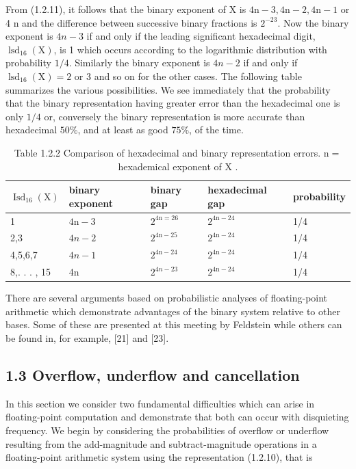 \documentclass[10pt]{article}
\begin{document}
From (1.2.11), it follows that the binary exponent of X is $4 \mathrm{n}-3,4 \mathrm{n}-2,4 \mathrm{n}-1$ or 4 n and the difference between successive binary fractions is $2^{-23}$. Now the binary exponent is $4 n-3$ if and only if the leading significant hexadecimal digit, $\operatorname{lsd}_{16}(\mathrm{X})$, is 1 which occurs according to the logarithmic distribution with probability $1 / 4$. Similarly the binary exponent is $4 n-2$ if and only if $\operatorname{lsd}_{16}(\mathrm{X})=2$ or 3 and so on for the other cases. The following table summarizes the various possibilities. We see immediately that the probability that the binary representation having greater error than the hexadecimal one is only $1 / 4$ or, conversely the binary representation is more accurate than hexadecimal $50 \%$, and at least as good $75 \%$, of the time.

\begin{table}[h]
\begin{center}
\captionsetup{labelformat=empty}
\caption{Table 1.2.2 Comparison of hexadecimal and binary representation errors. $\mathrm{n}=$ hexademical exponent of X .}
\begin{tabular}{|l|l|l|l|l|}
\hline
$\operatorname{Isd}_{16}(\mathrm{X})$ & binary exponent & binary gap & hexadecimal gap & probability \\
\hline
1 & $4 \mathrm{n}-3$ & $2^{4 \mathrm{n}=26}$ & $2^{4 \mathrm{n}-24}$ & 1/4 \\
\hline
2,3 & $4 n-2$ & $2^{4 \mathrm{n}-25}$ & $2^{4 \mathrm{n}-24}$ & 1/4 \\
\hline
4,5,6,7 & $4 n-1$ & $2^{4 \mathrm{n}-24}$ & $2^{4 \mathrm{n}-24}$ & 1/4 \\
\hline
8,. . . , 15 & 4n & $2^{4 n-23}$ & $2^{4 \mathrm{n}-24}$ & 1/4 \\
\hline
\end{tabular}
\end{center}
\end{table}

There are several arguments based on probabilistic analyses of floating-point arithmetic which demonstrate advantages of the binary system relative to other bases. Some of these are presented at this meeting by Feldstein while others can be found in, for example, [21] and [23].

\subsection*{1.3 Overflow, underflow and cancellation}
In this section we consider two fundamental difficulties which can arise in floating-point computation and demonstrate that both can occur with disquieting frequency. We begin by considering the probabilities of overflow or underflow resulting from the add-magnitude and subtract-magnitude operations in a floating-point arithmetic system using the representation (1.2.10), that is
\end{document}
